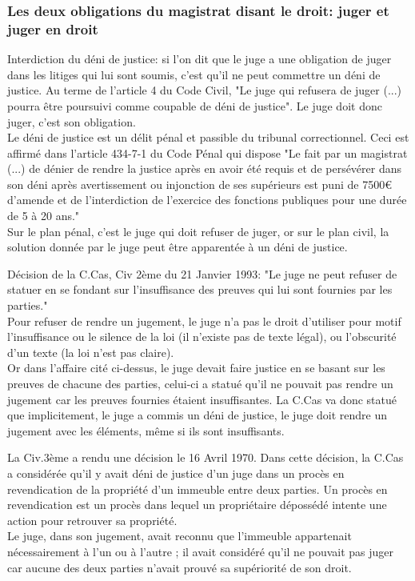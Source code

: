\subsubsection{Les deux obligations du magistrat disant le droit: juger et juger en droit}

Interdiction du déni de justice: si l'on dit que le juge a une obligation de juger dans les litiges qui lui sont soumis, c'est qu'il ne peut commettre un déni de justice. Au terme de l'article 4 du Code Civil,  "Le juge qui refusera de juger (...) pourra être poursuivi comme coupable de déni de justice". Le juge doit donc juger, c'est son obligation. \\
Le déni de justice est un délit pénal et passible du tribunal correctionnel. Ceci est affirmé dans l'article 434-7-1 du Code Pénal qui dispose "Le fait par un magistrat (...) de dénier de rendre la justice après en avoir été requis et de persévérer dans son déni après avertissement ou injonction de ses supérieurs est puni de 7500€ d'amende et de l'interdiction de l'exercice des fonctions publiques pour une durée de 5 à 20 ans." \\
Sur le plan pénal, c'est le juge qui doit refuser de juger, or sur le plan civil, la solution donnée par le juge peut être apparentée à un déni de justice.


Décision de la C.Cas, Civ 2ème du 21 Janvier 1993: "Le juge ne peut refuser de statuer en se fondant sur l'insuffisance des preuves qui lui sont fournies par les parties." \\
Pour refuser de rendre un jugement, le juge n'a pas le droit d'utiliser pour motif l'insuffisance ou le silence de la loi (il n'existe pas de texte légal), ou l'obscurité d'un texte (la loi n'est pas claire). \\
Or dans l'affaire cité ci-dessus, le juge devait faire justice en se basant sur les preuves de chacune des parties, celui-ci a statué qu'il ne pouvait pas rendre un jugement car les preuves fournies étaient insuffisantes. La C.Cas va donc statué que implicitement, le juge a commis un déni de justice, le juge doit rendre un jugement avec les éléments, même si ils sont insuffisants. 


La Civ.3ème a rendu une décision le 16 Avril 1970. Dans cette décision, la C.Cas a considérée qu'il y avait déni de justice d'un juge dans un procès en revendication de la propriété d'un immeuble entre deux parties. Un procès en revendication est un procès dans lequel un propriétaire dépossédé intente une action pour retrouver sa propriété. \\ 
Le juge, dans son jugement, avait reconnu que l'immeuble appartenait nécessairement à l'un ou à l'autre ; il avait considéré qu'il ne pouvait pas juger car aucune des deux parties n'avait prouvé sa supériorité de son droit.


